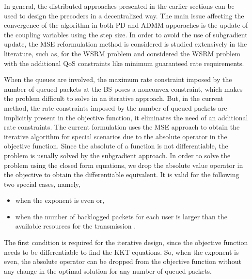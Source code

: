 
In general, the distributed approaches presented in the earlier sections can be used to design the precoders in a decentralized way. The main issue affecting the convergence of the algorithm in both \acl{PD} and \ac{ADMM} apporaches is the update of the coupling variables using the step size. In order to avoid the use of subgradient update, the \ac{MSE} reformulation method is considered is studied extensively in the literature, such as, \cite{wmmse_shi} for the \ac{WSRM} problem and \cite{kaleva2012weighted} considered the \ac{WSRM} problem with the additional \ac{QoS} constraints like minimum guaranteed rate requirements.

When the queues are involved, the maximum rate constraint imposed by the number of queued packets at the \ac{BS} poses a nonconvex constraint, which makes the problem difficult to solve in an iterative approach. But, in the current method, the rate constraints imposed by the number of queued packets are implicitly present in the objective function, it eliminates the need of an additional rate constraints. The current formulation uses the \ac{MSE} approach to obtain the iterative algorithm for special scenarios due to the absolute operator in the objective function. Since the absolute of a function is not differentiable, the problem is usually solved by the subgradient approach. In order to solve the problem using the closed form equations, we drop the absolute value operator in the objective to obtain the differentiable equivalent. It is valid for the following two special cases, namely, 
\begin{itemize}
\item when the exponent  is even or,
\item when the number of backlogged packets for each user is larger than the available resources for the transmission .
\end{itemize}
The first condition is required for the iterative design, since the objective function needs to be differentiable to find the \ac{KKT} equations. So, when the exponent  is even, the absolute operator can be dropped from the objective function without any change in the optimal solution for any number of queued packets.

